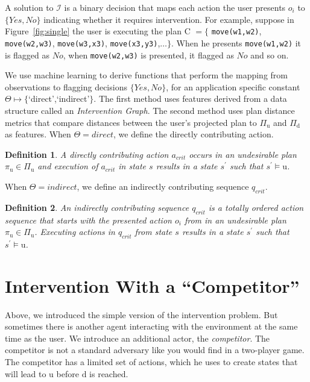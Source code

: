 \documentclass[letterpaper]{article}
\theoremstyle{plain}
\newtheorem{definition}{Definition}
\begin{document}
A solution to $\mathcal{I}$ is a binary decision that maps each action the user presents $o_i$ to $\lbrace Yes,No\rbrace$ indicating whether it requires intervention. For example, suppose in Figure~\ref{fig:single} the user is executing the plan C $=\lbrace$ \texttt{move(w1,w2)}, \texttt{move(w2,w3)}, \texttt{move(w3,x3)}, \texttt{move(x3,y3)},$\ldots \rbrace$. When he presents \texttt{move(w1,w2)} it is flagged as $No$, when \texttt{move(w2,w3)} is presented, it flagged as $No$ and so on.


We use machine learning to derive functions that perform the mapping from observations to flagging decisions $\lbrace Yes, No\rbrace$, for an application specific constant $\Theta\mapsto\lbrace$`direct',`indirect'$\rbrace$.
The first method uses features derived from a data structure called an \textit{Intervention Graph}. 
The second method uses plan distance metrics that compare distances between the user's projected plan to $\Pi_{\mathrm{u}}$ and $\Pi_{\mathrm{d}}$ as features. When $\Theta=direct$, we define the directly contributing action.
\begin{definition}
A \textnormal{directly contributing action} $a_{crit}$ occurs in an undesirable plan $\pi_{\mathrm{u}}\in \Pi_{\mathrm{u}}$ and execution of $a_{crit}$ in state $s$ results in a state $s^\prime$ such that $s^\prime\models \mathrm{u}$.
\end{definition}
\noindent When $\Theta=indirect$, we define an indirectly contributing sequence $q_{crit}$.
\begin{definition}
An \textnormal{indirectly contributing sequence} $q_{crit}$ is a totally ordered action sequence that starts with the presented action $o_i$ from in an undesirable plan $\pi_{\mathrm{u}}\in \Pi_{\mathrm{u}}$. Executing actions in $q_{crit}$ from state $s$ results in a state $s^\prime$ such that $s^\prime\models \mathrm{u}$.
\end{definition}
\section{Intervention With a ``Competitor''}
\label{sec:example}
Above, we introduced the simple version of the intervention problem.
But sometimes there is another agent interacting with the environment at the same time as the user.
We introduce an additional actor, the \textit{competitor}. 
The competitor is not a standard adversary like you would find in a two-player game.
The competitor has a limited set of actions, which he uses to create states that will lead to $\mathrm{u}$ before $\mathrm{d}$ is reached. 
\end{document}

